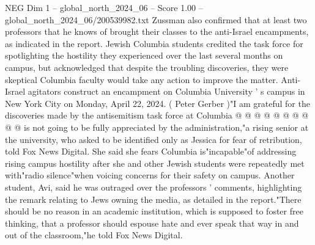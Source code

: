 \begin{textsample}{NEG Dim 1 – global\_north\_2024\_06 – Score 1.00 – global\_north\_2024\_06/200539982.txt}
Zussman also confirmed that at least two professors that he knows of brought their classes to the anti-Israel encampments, as indicated in the report.
Jewish Columbia students credited the task force for spotlighting the hostility they experienced over the last several months on campus, but acknowledged that despite the troubling discoveries, they were skeptical Columbia faculty would take any action to improve the matter.
Anti-Israel agitators construct an encampment on Columbia University ' s campus in New York City on Monday, April 22, 2024. ( Peter Gerber )"I am grateful for the discoveries made by the antisemitism task force at Columbia @ @ @ @ @ @ @ @ @ @ is not going to be fully appreciated by the administration,"a rising senior at the university, who asked to be identified only as Jessica for fear of retribution, told Fox News Digital.
She said she fears Columbia is"incapable"of addressing rising campus hostility after she and other Jewish students were repeatedly met with"radio silence"when voicing concerns for their safety on campus.
Another student, Avi, said he was outraged over the professors ' comments, highlighting the remark relating to Jews owning the media, as detailed in the report."There should be no reason in an academic institution, which is supposed to foster free thinking, that a professor should espouse hate and ever speak that way in and out of the classroom,"he told Fox News Digital.

\end{textsample}
